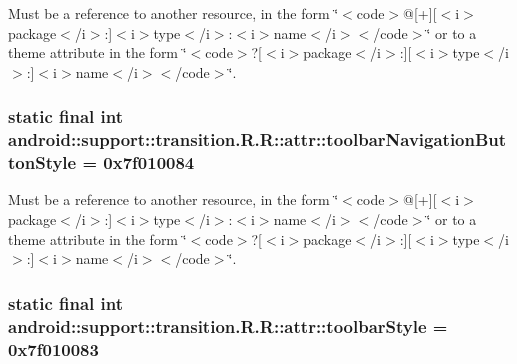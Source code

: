 Must be a reference to another resource, in the form \char`\"{}$<$code$>$@\mbox{[}+\mbox{]}\mbox{[}$<$i$>$package$<$/i$>$:\mbox{]}$<$i$>$type$<$/i$>$:$<$i$>$name$<$/i$>$$<$/code$>$\char`\"{} or to a theme attribute in the form \char`\"{}$<$code$>$?\mbox{[}$<$i$>$package$<$/i$>$:\mbox{]}\mbox{[}$<$i$>$type$<$/i$>$:\mbox{]}$<$i$>$name$<$/i$>$$<$/code$>$\char`\"{}. \hypertarget{classandroid_1_1support_1_1transition_1_1_r_1_1attr_dbbf0a6934cab4ff2a114213073b147b}{
\subsubsection[{toolbarNavigationButtonStyle}]{\setlength{\rightskip}{0pt plus 5cm}static final int android::support::transition.R.R::attr::toolbarNavigationButtonStyle = 0x7f010084}}
\label{classandroid_1_1support_1_1transition_1_1_r_1_1attr_dbbf0a6934cab4ff2a114213073b147b}


Must be a reference to another resource, in the form \char`\"{}$<$code$>$@\mbox{[}+\mbox{]}\mbox{[}$<$i$>$package$<$/i$>$:\mbox{]}$<$i$>$type$<$/i$>$:$<$i$>$name$<$/i$>$$<$/code$>$\char`\"{} or to a theme attribute in the form \char`\"{}$<$code$>$?\mbox{[}$<$i$>$package$<$/i$>$:\mbox{]}\mbox{[}$<$i$>$type$<$/i$>$:\mbox{]}$<$i$>$name$<$/i$>$$<$/code$>$\char`\"{}. \hypertarget{classandroid_1_1support_1_1transition_1_1_r_1_1attr_c17c0e610924613622eb0aa15fd91219}{
\subsubsection[{toolbarStyle}]{\setlength{\rightskip}{0pt plus 5cm}static final int android::support::transition.R.R::attr::toolbarStyle = 0x7f010083}}
\label{classandroid_1_1support_1_1transition_1_1_r_1_1attr_c17c0e610924613622eb0aa15fd91219}


